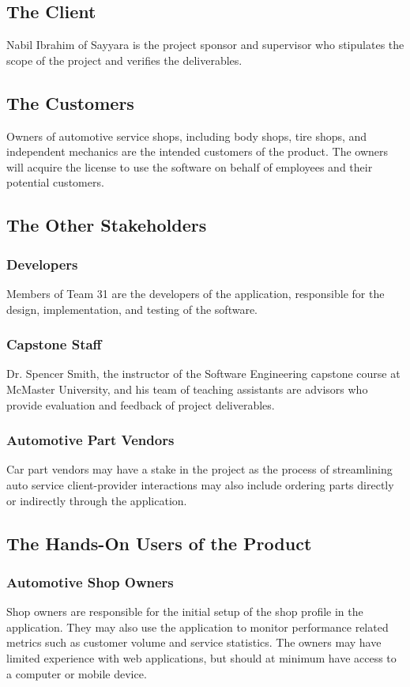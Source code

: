 \documentclass[12pt]{article}
\begin{document}
\subsection{The Client}
Nabil Ibrahim of Sayyara is the project sponsor and supervisor who stipulates
the scope of the project and verifies the deliverables.
\subsection{The Customers}
Owners of automotive service shops, including body shops, tire shops, and
independent mechanics are the intended customers of the product. The owners
will acquire the license to use the software on behalf of employees and their
potential customers.
\subsection{The Other Stakeholders}
\subsubsection{Developers}
Members of Team 31 are the developers of the application, responsible for the
design, implementation, and testing of the software.
\subsubsection{Capstone Staff}
Dr. Spencer Smith, the instructor of the Software Engineering capstone course
at McMaster University, and his team of teaching assistants are advisors who
provide evaluation and feedback of project deliverables.
\subsubsection{Automotive Part Vendors}
Car part vendors may have a stake in the project as the process of streamlining
auto service client-provider interactions may also include ordering parts
directly or indirectly through the application.

\subsection{The Hands-On Users of the Product}
\subsubsection{Automotive Shop Owners}
Shop owners are responsible for the initial setup of the shop profile in the
application. They may also use the application to monitor performance related
metrics such as customer volume and service statistics. The owners may have
limited experience with web applications, but should at minimum have access to
a computer or mobile device.
\end{document}
